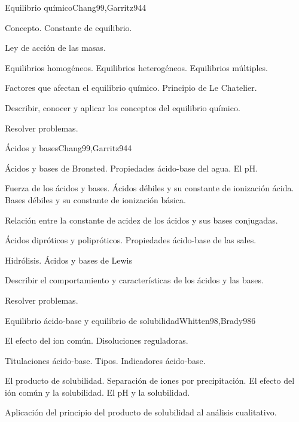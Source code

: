 \begin{syllabus}
\begin{unit}{Equilibrio químico}{Chang99,Garritz94}{4}
\begin{topics}
      \item Concepto. Constante de equilibrio.
      \item Ley de acción de las masas.
      \item Equilibrios homogéneos. Equilibrios heterogéneos. Equilibrios múltiples.
      \item Factores que afectan el equilibrio químico. Principio de Le Chatelier.
    \end{topics}
   \begin{unitgoals}
      \item Describir, conocer y aplicar los conceptos del equilibrio químico.
      \item Resolver problemas.
   \end{unitgoals}
\end{unit}

\begin{unit}{Ácidos y bases}{Chang99,Garritz94}{4}
\begin{topics}
	\item Ácidos y bases de Bronsted. Propiedades ácido-base del agua. El pH.
	\item Fuerza de los ácidos y bases. Ácidos débiles y su constante de ionización ácida. Bases débiles y su constante de ionización básica. 
	\item Relación entre la constante de acidez de los ácidos y sus bases conjugadas.
	\item Ácidos dipróticos y polipróticos. Propiedades ácido-base de las sales.
	\item Hidrólisis.  Ácidos y bases de Lewis
\end{topics}

\begin{unitgoals}
	\item Describir el comportamiento y características de los ácidos y las bases.
	\item Resolver problemas.
\end{unitgoals}
\end{unit}

\begin{unit}{Equilibrio ácido-base y equilibrio de solubilidad}{Whitten98,Brady98}{6}
\begin{topics}
	\item El efecto del ion común. Disoluciones reguladoras.
	\item Titulaciones ácido-base. Tipos.  Indicadores ácido-base.
	\item El producto de solubilidad. Separación de iones por precipitación. El efecto del ión común y la solubilidad. El pH y la solubilidad.
	\item Aplicación del principio del producto de solubilidad al análisis cualitativo.
\end{topics}


\end{unit}
\end{syllabus}
